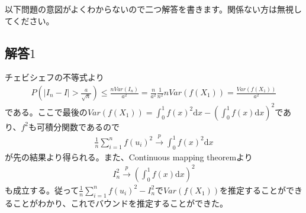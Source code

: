 \documentclass{article}
\begin{document}
以下問題の意図がよくわからないので二つ解答を書きます。関係ない方は無視してください。
\subsection{解答$1$}
チェビシェフの不等式より
\begin{align*}
	P\left( \left| I_n - I \right| > \frac{a}{\sqrt{n}} \right) \leq \frac{nVar(I_n)}{a^2} = \frac{n}{a^2} \frac{1}{n^2} nVar\left( f(X_1) \right) = \frac{Var\left( f(X_1) \right)}{a^2}
\end{align*}
である。ここで最後の$Var\left( f(X_1) \right) = \int_0^1 {f(x)}^2 \mathrm{d}x - \left( \int_0^1 f(x) \mathrm{d}x \right)^2$であり、$f^2$も可積分関数であるので
\begin{align*}
	\frac{1}{n} \sum_{i=1}^n f(u_i)^2 \xrightarrow{p} \int_0^1 f(x)^2 \mathrm{d}x
\end{align*}
が先の結果より得られる。また、Continuous mapping theoremより
\begin{align*}
	I_n^2 \xrightarrow{p} \left( \int_0^1 f(x) \mathrm{d}x \right)^2
\end{align*}
も成立する。従って$\frac{1}{n} \sum_{i=1}^n f(u_i)^2 - I_n^2$で$Var\left( f(X_1) \right)$を推定することができることがわかり、これでバウンドを推定することができた。
\end{document}
